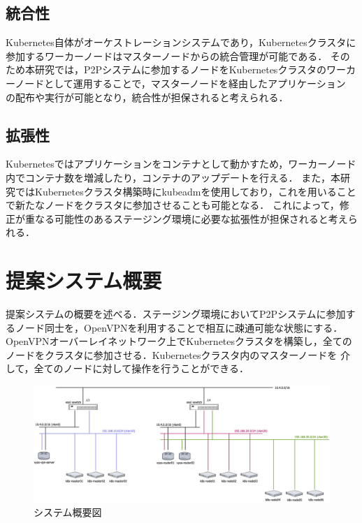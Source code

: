 \subsection{統合性}
Kubernetes自体がオーケストレーションシステムであり，Kubernetesクラスタに参加するワーカーノードはマスターノードからの統合管理が可能である．
そのため本研究では，P2Pシステムに参加するノードをKubernetesクラスタのワーカーノードとして運用することで，マスターノードを経由したアプリケーション
の配布や実行が可能となり，統合性が担保されると考えられる．

\subsection{拡張性}
Kubernetesではアプリケーションをコンテナとして動かすため，ワーカーノード内でコンテナ数を増減したり，コンテナのアップデートを行える．
また，本研究ではKubernetesクラスタ構築時にkubeadmを使用しており，これを用いることで新たなノードをクラスタに参加させることも可能となる．
これによって，修正が重なる可能性のあるステージング環境に必要な拡張性が担保されると考えられる．

\section{提案システム概要}
\label{issue:about-system}
提案システムの概要を述べる．ステージング環境においてP2Pシステムに参加するノード同士を，OpenVPNを利用することで相互に疎通可能な状態にする．
OpenVPNオーバーレイネットワーク上でKubernetesクラスタを構築し，全てのノードをクラスタに参加させる．Kubernetesクラスタ内のマスターノードを
介して，全てのノードに対して操作を行うことができる．

\begin{figure}[htbp]
  \begin{center}
    \includegraphics[width=\textwidth]{./figures/system-diagram.jpg}
    \caption{システム概要図}
  \end{center}
\end{figure}

